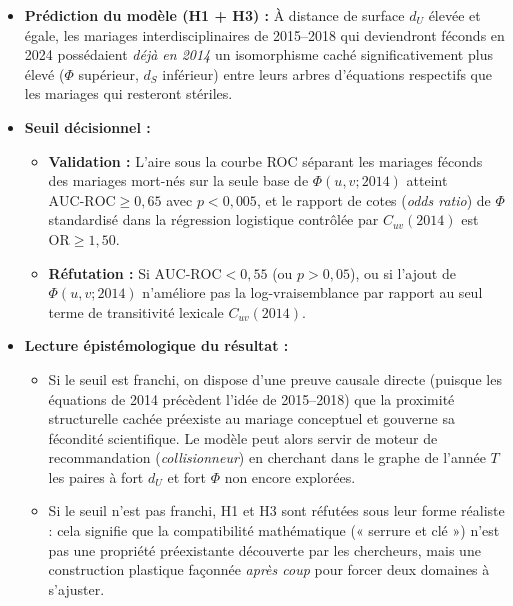 \documentclass[a4paper,11pt]{article}
\providecommand{\tightlist}{\setlength{\itemsep}{0pt}\setlength{\parskip}{0pt}}
\begin{document}
\begin{itemize}
\tightlist
\item
  \textbf{Prédiction du modèle (H1 + H3) :} À distance de surface
  \(d_U\) élevée et égale, les mariages interdisciplinaires de
  2015--2018 qui deviendront féconds en 2024 possédaient \emph{déjà en
  2014} un isomorphisme caché significativement plus élevé (\(\Phi\)
  supérieur, \(d_S\) inférieur) entre leurs arbres d'équations
  respectifs que les mariages qui resteront stériles.
\item
  \textbf{Seuil décisionnel :}

  \begin{itemize}
  \tightlist
  \item
    \textbf{Validation :} L'aire sous la courbe ROC séparant les
    mariages féconds des mariages mort-nés sur la seule base de
    \(\Phi(u,v;2014)\) atteint \textbf{\(\text{AUC-ROC} \ge 0,65\)} avec
    \textbf{\(p < 0,005\)}, et le rapport de cotes (\emph{odds ratio})
    de \(\Phi\) standardisé dans la régression logistique contrôlée par
    \(C_{uv}(2014)\) est \textbf{\(\text{OR} \ge 1,50\)}.
  \item
    \textbf{Réfutation :} Si \textbf{\(\text{AUC-ROC} < 0,55\)} (ou
    \(p > 0,05\)), ou si l'ajout de \(\Phi(u,v;2014)\) n'améliore pas la
    log-vraisemblance par rapport au seul terme de transitivité lexicale
    \(C_{uv}(2014)\).
  \end{itemize}
\item
  \textbf{Lecture épistémologique du résultat :}

  \begin{itemize}
  \tightlist
  \item
    Si le seuil est franchi, on dispose d'une preuve causale directe
    (puisque les équations de 2014 précèdent l'idée de 2015--2018) que
    la proximité structurelle cachée préexiste au mariage conceptuel et
    gouverne sa fécondité scientifique. Le modèle peut alors servir de
    moteur de recommandation (\emph{collisionneur}) en cherchant dans le
    graphe de l'année \(T\) les paires à fort \(d_U\) et fort \(\Phi\)
    non encore explorées.
  \item
    Si le seuil n'est pas franchi, H1 et H3 sont réfutées sous leur
    forme réaliste : cela signifie que la compatibilité mathématique («
    serrure et clé ») n'est pas une propriété préexistante découverte
    par les chercheurs, mais une construction plastique façonnée
    \emph{après coup} pour forcer deux domaines à s'ajuster.
  \end{itemize}
\end{itemize}
\end{document}
